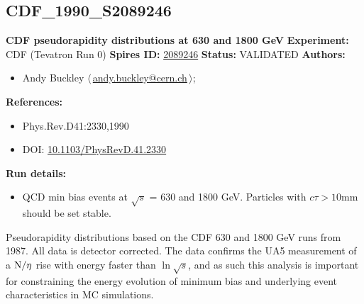 \subsection{CDF\_1990\_S2089246}
\textbf{CDF pseudorapidity distributions at 630 and 1800 GeV}\newline
\textbf{Experiment:} CDF (Tevatron Run 0) \newline
\textbf{Spires ID:} \href{http://www.slac.stanford.edu/spires/find/hep/www?rawcmd=key+2089246}{2089246}\newline
\textbf{Status:} VALIDATED\newline
\textbf{Authors:}
\begin{itemize}
  \item Andy Buckley $\langle\,$\href{mailto:andy.buckley@cern.ch}{andy.buckley@cern.ch}$\,\rangle$;
\end{itemize}
\textbf{References:}
\begin{itemize}
  \item Phys.Rev.D41:2330,1990
  \item DOI: \href{http://dx.doi.org/10.1103/PhysRevD.41.2330}{10.1103/PhysRevD.41.2330}
\end{itemize}
\textbf{Run details:}
\begin{itemize}

  \item QCD min bias events at \ensuremath{\sqrt{s}} = 630 and 1800 GeV. Particles with $c \tau > 10$mm should be set stable.\end{itemize}

\noindent Pseudorapidity distributions based on the CDF 630 and 1800 GeV runs from 1987. All data is detector corrected. The data confirms the UA5 measurement of a $\d{N}/\d{\eta}$ rise with energy faster than $\ln{\sqrt{s}}$, and as such this analysis is important for constraining the energy evolution of minimum bias and underlying event characteristics in MC simulations.

\clearpage


\clearpage

